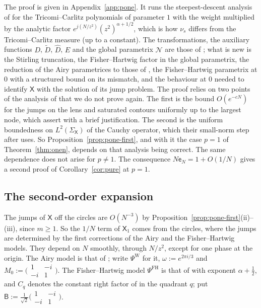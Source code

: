 The proof is given in Appendix~\ref{app:pone}. It runs the steepest-descent analysis of \cite[\S\S3--6]{WLXZ} for the
Tricomi--Carlitz polynomials of parameter $1$ with the weight multiplied by the analytic factor
$e^{j(N/z^2)}(z^2)^{\alpha+1/2}$, which is how $\nu_s$ differs from the Tricomi--Carlitz measure (up to a constant). The
transformations, the auxiliary functions $D$, $\tilde D$, $\hat D$, $E$ and the global parametrix $\mathcal N$ are those of
\cite{WLXZ}; what is new is the Stirling truncation, the Fisher--Hartwig factor in the global parametrix, the reduction
of the Airy parametrices to those of \cite[\S6.1]{WLXZ}, the Fisher--Hartwig parametrix at $0$ with a structured bound on
its mismatch, and the behaviour at $0$ needed to identify $\mathsf X$ with the solution of its jump problem. The proof
relies on two points of the analysis of \cite{WLXZ} that we do not prove again. The first is the bound $O(e^{-cN})$ for
the jumps on the lens and saturated contours uniformly up to the largest node, which \cite[(5.8), (6.34)]{WLXZ} assert
with a brief justification. The second is the uniform boundedness on $L^2(\Sigma_{\mathsf X})$ of the Cauchy operator,
which their small-norm step after \cite[(6.35)]{WLXZ} uses. So Proposition~\ref{prop:pone-first}, and with it the case $p=1$ of
Theorem~\ref{thm:onen}, depends on that analysis being correct. The same dependence does not arise for $p\ne1$. The
consequence $N\mathsf e_N=1+O(1/N)$ gives a second proof of Corollary~\ref{cor:pure} at $p=1$.

\subsection{The second-order expansion}\label{sec:pone-second}

The jumps of $\mathsf X$ off the circles are $O(N^{-3})$ by Proposition~\ref{prop:pone-first}(ii)--(iii), since
$m\ge1$. So the $1/N$ term of $\mathsf X_1$ comes from the circles, where the jumps are determined by the first
corrections of the Airy and the Fisher--Hartwig models. They depend on $N$ smoothly, through $N/z^2$, except for one
phase at the origin. The Airy model is that of \cite[(6.8)]{WLXZ}; write $\Psi^{\mathrm W}$ for it, $\omega:=e^{2\pi i/3}$ and
$M_0:=\bigl(\begin{smallmatrix}1&-i\\-i&1\end{smallmatrix}\bigr)$. The Fisher--Hartwig model $\Psi^{\mathrm{FH}}$ is that of
\cite[(4.26)--(4.33)]{Van} with exponent $\alpha+\frac12$, and $C_q$ denotes the constant right factor of
\cite[(4.43)--(4.46)]{Van} in the quadrant $q$; put
$\mathsf B:=\frac1{\sqrt2}\bigl(\begin{smallmatrix}1&-i\\-i&1\end{smallmatrix}\bigr)$.

